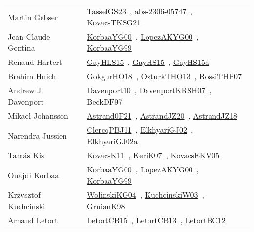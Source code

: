 {\begin{longtable}{p{4cm}p{20cm}}
Martin Gebser & \href{works/TasselGS23.pdf}{TasselGS23}~\cite{TasselGS23}, \href{works/abs-2306-05747.pdf}{abs-2306-05747}~\cite{abs-2306-05747}, \href{works/KovacsTKSG21.pdf}{KovacsTKSG21}~\cite{KovacsTKSG21}\\
Jean{-}Claude Gentina & \href{works/KorbaaYG00.pdf}{KorbaaYG00}~\cite{KorbaaYG00}, \href{works/LopezAKYG00.pdf}{LopezAKYG00}~\cite{LopezAKYG00}, \href{works/KorbaaYG99.pdf}{KorbaaYG99}~\cite{KorbaaYG99}\\
Renaud Hartert & \href{works/GayHLS15.pdf}{GayHLS15}~\cite{GayHLS15}, \href{works/GayHS15.pdf}{GayHS15}~\cite{GayHS15}, \href{works/GayHS15a.pdf}{GayHS15a}~\cite{GayHS15a}\\
Brahim Hnich & \href{works/GokgurHO18.pdf}{GokgurHO18}~\cite{GokgurHO18}, \href{works/OzturkTHO13.pdf}{OzturkTHO13}~\cite{OzturkTHO13}, \href{works/RossiTHP07.pdf}{RossiTHP07}~\cite{RossiTHP07}\\
Andrew J. Davenport & \href{works/Davenport10.pdf}{Davenport10}~\cite{Davenport10}, \href{works/DavenportKRSH07.pdf}{DavenportKRSH07}~\cite{DavenportKRSH07}, \href{works/BeckDF97.pdf}{BeckDF97}~\cite{BeckDF97}\\
Mikael Johansson & \href{works/Astrand0F21.pdf}{Astrand0F21}~\cite{Astrand0F21}, \href{works/AstrandJZ20.pdf}{AstrandJZ20}~\cite{AstrandJZ20}, \href{works/AstrandJZ18.pdf}{AstrandJZ18}~\cite{AstrandJZ18}\\
Narendra Jussien & \href{works/ClercqPBJ11.pdf}{ClercqPBJ11}~\cite{ClercqPBJ11}, \href{works/ElkhyariGJ02.pdf}{ElkhyariGJ02}~\cite{ElkhyariGJ02}, \href{works/ElkhyariGJ02a.pdf}{ElkhyariGJ02a}~\cite{ElkhyariGJ02a}\\
Tam{\'{a}}s Kis & \href{works/KovacsK11.pdf}{KovacsK11}~\cite{KovacsK11}, \href{works/KeriK07.pdf}{KeriK07}~\cite{KeriK07}, \href{works/KovacsEKV05.pdf}{KovacsEKV05}~\cite{KovacsEKV05}\\
Ouajdi Korbaa & \href{works/KorbaaYG00.pdf}{KorbaaYG00}~\cite{KorbaaYG00}, \href{works/LopezAKYG00.pdf}{LopezAKYG00}~\cite{LopezAKYG00}, \href{works/KorbaaYG99.pdf}{KorbaaYG99}~\cite{KorbaaYG99}\\
Krzysztof Kuchcinski & \href{works/WolinskiKG04.pdf}{WolinskiKG04}~\cite{WolinskiKG04}, \href{works/KuchcinskiW03.pdf}{KuchcinskiW03}~\cite{KuchcinskiW03}, \href{works/GruianK98.pdf}{GruianK98}~\cite{GruianK98}\\
Arnaud Letort & \href{works/LetortCB15.pdf}{LetortCB15}~\cite{LetortCB15}, \href{works/LetortCB13.pdf}{LetortCB13}~\cite{LetortCB13}, \href{works/LetortBC12.pdf}{LetortBC12}~\cite{LetortBC12}\\

\end{longtable}}

